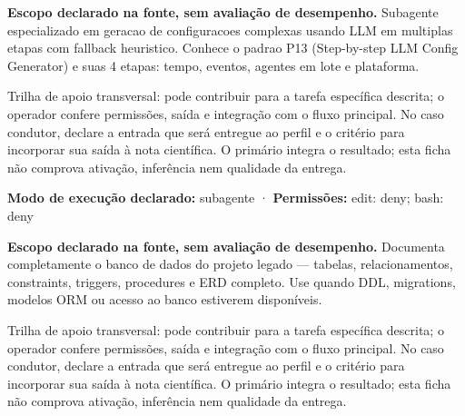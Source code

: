 
\begin{descricao}
\textbf{Escopo declarado na fonte, sem avaliação de desempenho.}
Subagente especializado em geracao de configuracoes complexas usando LLM em multiplas etapas com fallback heuristico. Conhece o padrao P13 (Step-by-step LLM Config Generator) e suas 4 etapas: tempo, eventos, agentes em lote e plataforma.
\end{descricao}

\begin{funcao}
Trilha de apoio transversal: pode contribuir para a tarefa específica descrita; o operador confere permissões, saída e integração com o fluxo principal. No caso condutor, declare a entrada que será entregue ao perfil e o critério para incorporar sua saída à nota científica. O primário integra o resultado; esta ficha não comprova ativação, inferência nem qualidade da entrega.
\end{funcao}

\begin{arquitetura}
\textbf{Modo de execução declarado:} subagente · \textbf{Permissões:} edit: deny; bash: deny
\end{arquitetura}


\begin{descricao}
\textbf{Escopo declarado na fonte, sem avaliação de desempenho.}
Documenta completamente o banco de dados do projeto legado — tabelas, relacionamentos, constraints, triggers, procedures e ERD completo. Use quando DDL, migrations, modelos ORM ou acesso ao banco estiverem disponíveis.
\end{descricao}

\begin{funcao}
Trilha de apoio transversal: pode contribuir para a tarefa específica descrita; o operador confere permissões, saída e integração com o fluxo principal. No caso condutor, declare a entrada que será entregue ao perfil e o critério para incorporar sua saída à nota científica. O primário integra o resultado; esta ficha não comprova ativação, inferência nem qualidade da entrega.
\end{funcao}

